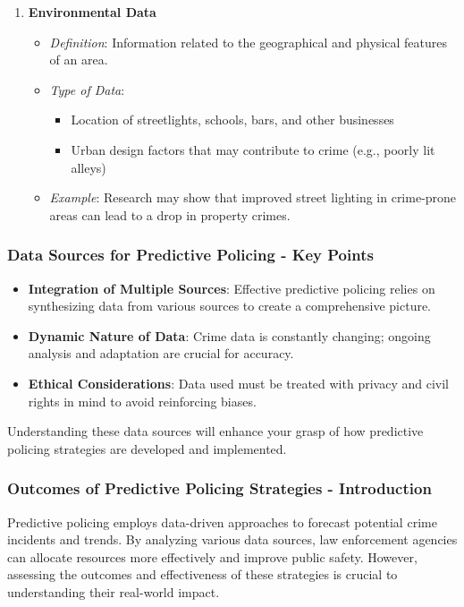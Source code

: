 \documentclass[aspectratio=169]{beamer}
\begin{document}
\begin{frame}[fragile]
\begin{enumerate}
        \item \textbf{Environmental Data}
        \begin{itemize}
            \item \textit{Definition}: Information related to the geographical and physical features of an area.
            \item \textit{Type of Data}:
            \begin{itemize}
                \item Location of streetlights, schools, bars, and other businesses
                \item Urban design factors that may contribute to crime (e.g., poorly lit alleys)
            \end{itemize}
            \item \textit{Example}: Research may show that improved street lighting in crime-prone areas can lead to a drop in property crimes.
        \end{itemize}
    \end{enumerate}
\end{frame}

\begin{frame}[fragile]
    \frametitle{Data Sources for Predictive Policing - Key Points}
    \begin{itemize}
        \item \textbf{Integration of Multiple Sources}: Effective predictive policing relies on synthesizing data from various sources to create a comprehensive picture.
        \item \textbf{Dynamic Nature of Data}: Crime data is constantly changing; ongoing analysis and adaptation are crucial for accuracy.
        \item \textbf{Ethical Considerations}: Data used must be treated with privacy and civil rights in mind to avoid reinforcing biases.
    \end{itemize}
    Understanding these data sources will enhance your grasp of how predictive policing strategies are developed and implemented.
\end{frame}

\begin{frame}[fragile]
    \frametitle{Outcomes of Predictive Policing Strategies - Introduction}
    Predictive policing employs data-driven approaches to forecast potential crime incidents and trends. By analyzing various data sources, law enforcement agencies can allocate resources more effectively and improve public safety. However, assessing the outcomes and effectiveness of these strategies is crucial to understanding their real-world impact.
\end{frame}
\end{document}

